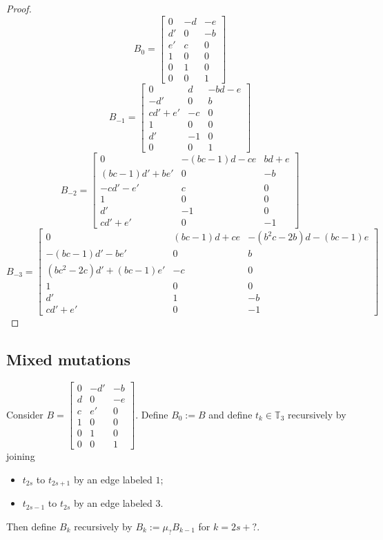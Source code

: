 \documentclass{amsart}
\numberwithin{theorem}{section}
\newcommand{\TT}{\mathbb{T}}
\begin{document}
\begin{proof}
    \[B_0=\left[\begin{array}{ccc} 0 & -d & -e \\ d' & 0 & -b\\ e' & c & 0\\ 1 & 0 & 0\\ 0 & 1 & 0\\ 0 & 0 & 1\end{array}\right]\]
    \[B_{-1}=\left[\begin{array}{ccc} 0 & d & -bd-e \\ -d' & 0 & b\\ cd'+e' & -c & 0\\ 1 & 0 & 0\\ d' & -1 & 0\\ 0 & 0 & 1\end{array}\right]\]
    \[B_{-2}=\left[\begin{array}{ccc} 0 & -(bc-1)d-ce & bd+e \\ (bc-1)d'+be' & 0 & -b\\ -cd'-e' & c & 0\\ 1 & 0 & 0\\ d' & -1 & 0\\ cd'+e' & 0 & -1\end{array}\right]\]
      \[B_{-3}=\left[\begin{array}{ccc} 0 & (bc-1)d+ce & -(b^2c-2b)d-(bc-1)e \\ -(bc-1)d'-be' & 0 & b\\ (bc^2-2c)d'+(bc-1)e' & -c & 0\\ 1 & 0 & 0\\ d' & 1 & -b\\ cd'+e' & 0 & -1\end{array}\right]\]

  \end{proof}

  \subsection{Mixed mutations}

  Consider $B=\left[\begin{array}{ccc} 0 & -d' & -b \\ d & 0 & -e\\ c & e' & 0\\ 1 & 0 & 0\\ 0 & 1 & 0\\ 0 & 0 & 1\end{array}\right]$.
  Define $B_0:=B$ and define $t_k\in\TT_3$ recursively by joining 
  \begin{itemize}
    \item $t_{2s}$ to $t_{2s+1}$ by an edge labeled $1$;
    \item $t_{2s-1}$ to $t_{2s}$ by an edge labeled $3$.
  \end{itemize}
  Then define $B_k$ recursively by $B_k:=\mu_? B_{k-1}$ for $k=2s+?$.
\end{document}
